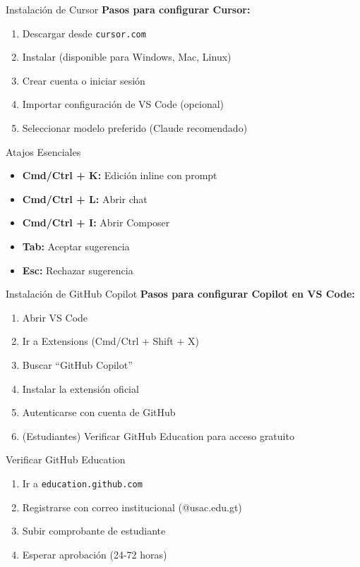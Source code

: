 \documentclass[aspectratio=169]{beamer}
\begin{document}
\begin{frame}{Instalación de Cursor}
    \textbf{Pasos para configurar Cursor:}
    \begin{enumerate}
        \setlength\itemsep{0.5em}
        \item Descargar desde \texttt{cursor.com}
        \item Instalar (disponible para Windows, Mac, Linux)
        \item Crear cuenta o iniciar sesión
        \item Importar configuración de VS Code (opcional)
        \item Seleccionar modelo preferido (Claude recomendado)
    \end{enumerate}
    
    \vspace{0.3cm}
    \begin{block}{Atajos Esenciales}
        \begin{itemize}
            \item \textbf{Cmd/Ctrl + K:} Edición inline con prompt
            \item \textbf{Cmd/Ctrl + L:} Abrir chat
            \item \textbf{Cmd/Ctrl + I:} Abrir Composer
            \item \textbf{Tab:} Aceptar sugerencia
            \item \textbf{Esc:} Rechazar sugerencia
        \end{itemize}
    \end{block}
\end{frame}

\begin{frame}{Instalación de GitHub Copilot}
    \textbf{Pasos para configurar Copilot en VS Code:}
    \begin{enumerate}
        \setlength\itemsep{0.5em}
        \item Abrir VS Code
        \item Ir a Extensions (Cmd/Ctrl + Shift + X)
        \item Buscar ``GitHub Copilot''
        \item Instalar la extensión oficial
        \item Autenticarse con cuenta de GitHub
        \item (Estudiantes) Verificar GitHub Education para acceso gratuito
    \end{enumerate}
    
    \vspace{0.3cm}
    \begin{exampleblock}{Verificar GitHub Education}
        \begin{enumerate}
            \item Ir a \texttt{education.github.com}
            \item Registrarse con correo institucional (@usac.edu.gt)
            \item Subir comprobante de estudiante
            \item Esperar aprobación (24-72 horas)
        \end{enumerate}
    \end{exampleblock}
\end{frame}
\end{document}
